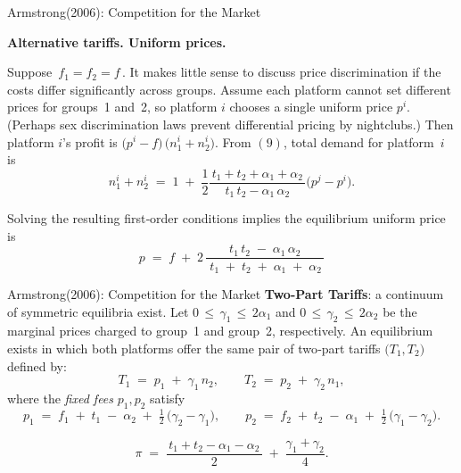 \documentclass[aspectratio=169]{beamer}  %
\begin{document}
\begin{frame}{Armstrong(2006): Competition for the Market}
    \justifying  %

    \textbf{Alternative tariffs. Uniform prices.} 
    
    \medskip
    
    Suppose \(\,f_{1} = f_{2} = f\,.\)  It makes little sense to discuss price discrimination if 
    the costs differ significantly across groups.  Assume each platform cannot set different prices 
    for groups~1 and~2, so platform \(i\) chooses a single uniform price \(p^{i}\). 
    (Perhaps sex discrimination laws prevent differential pricing by nightclubs.)  
    Then platform \(i\)’s profit is \(\bigl(p^{i} - f\bigr)\,\bigl(n_{1}^{i} + n_{2}^{i}\bigr)\).  
    From \((9)\), total demand for platform~\(i\) is
    \[
      n_{1}^{i} + n_{2}^{i}
      \;=\;
      1
      \;+\;
      \frac{1}{2}
      \frac{\,t_{1} + t_{2} + \alpha_{1} + \alpha_{2}\,}
           {\,t_{1}\,t_{2} - \alpha_{1}\,\alpha_{2}\,}
      \bigl(p^{j} - p^{i}\bigr).
    \]
    
    Solving the resulting first‐order conditions implies the equilibrium uniform price is
    \[
      p 
      \;=\; 
      f 
      \;+\;
      2\,\frac{\;t_{1}\,t_{2} \;-\; \alpha_{1}\,\alpha_{2}\;}
                {\;t_{1} \;+\; t_{2} \;+\; \alpha_{1} \;+\; \alpha_{2}\,}
      \tag{8}
    \]
\end{frame}

\begin{frame}{Armstrong(2006): Competition for the Market}
    \justifying  %
    \textbf{Two-Part Tariffs}: a continuum of symmetric equilibria exist. Let 
    \(0 \,\leq\, \gamma_{1} \,\leq\, 2\alpha_{1}\) and 
    \(0 \,\leq\, \gamma_{2} \,\leq\, 2\alpha_{2}\)
    be the marginal prices charged to group~1 and group~2, respectively. 
    An equilibrium exists in which both platforms offer the same pair of two‐part tariffs 
    \(\bigl(T_{1},T_{2}\bigr)\) defined by:
    \[
       T_{1} \;=\; p_{1} \;+\; \gamma_{1}\,n_{2}, 
       \qquad
       T_{2} \;=\; p_{2} \;+\; \gamma_{2}\,n_{1},
    \]
    where the \emph{fixed fees} \(p_{1}, p_{2}\) satisfy
    \[
       p_{1} 
       \;=\; 
       f_{1} 
       \;+\; 
       t_{1} 
       \;-\; 
       \alpha_{2}
       \;+\; 
       \tfrac{1}{2}\,\bigl(\gamma_{2} - \gamma_{1}\bigr),
       \qquad
       p_{2} 
       \;=\; 
       f_{2} 
       \;+\;
       t_{2} 
       \;-\; 
       \alpha_{1}
       \;+\; 
       \tfrac{1}{2}\,\bigl(\gamma_{1} - \gamma_{2}\bigr).
       \tag{17}
    \]

    \[
       \pi 
       \;=\; 
       \frac{\,t_{1} + t_{2} - \alpha_{1} - \alpha_{2}\,}{2} 
       \;+\; 
       \frac{\gamma_{1} + \gamma_{2}}{4}.
    \]
\end{frame}
\end{document}
